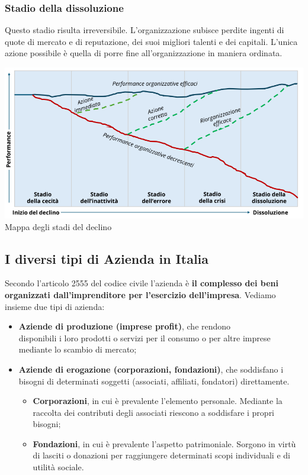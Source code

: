 \documentclass[14pt]{extarticle}
\begin{document}
\subsubsection{Stadio della dissoluzione}

Questo stadio risulta irreversibile. L'organizzazione subisce perdite ingenti di
quote di mercato e di reputazione, dei suoi migliori talenti e dei capitali.
L'unica azione possibile è quella di porre fine all'organizzazione in maniera
ordinata.

\begin{center}
    \includegraphics[scale=0.60]{images/stadi_declino.png}
    Mappa degli stadi del declino
\end{center}

\newpage
\subsection{I diversi tipi di Azienda in Italia}

Secondo l'articolo 2555 del codice civile l'azienda è \textbf{il complesso dei
beni organizzati dall'imprenditore per l'esercizio dell'impresa}. Vediamo
insieme due tipi di azienda:

\begin{itemize}
    \item \textbf{Aziende di produzione (imprese profit)}, che rendono \\
    disponibili i loro prodotti o servizi per il consumo o per altre imprese
    mediante lo scambio di mercato; 
    \item \textbf{Aziende di erogazione (corporazioni, fondazioni)}, che
    soddisfano i bisogni di determinati soggetti (associati, affiliati,
    fondatori) direttamente.
    \begin{itemize}
        \item \textbf{Corporazioni}, in cui è prevalente l'elemento personale.
        Mediante la raccolta dei contributi degli associati riescono a
        soddisfare i propri bisogni;
        \item \textbf{Fondazioni}, in cui è prevalente l'aspetto patrimoniale.
        Sorgono in virtù di lasciti o donazioni per raggiungere determinati
        scopi individuali e di utilità sociale. 
    \end{itemize} 
\end{itemize}
\end{document}

